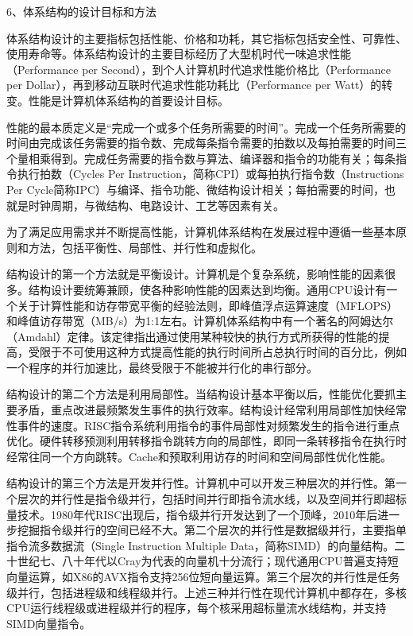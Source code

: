 \documentclass[]{ctexbook}
\begin{document}
6、体系结构的设计目标和方法

体系结构设计的主要指标包括性能、价格和功耗，其它指标包括安全性、可靠性、使用寿命等。体系结构设计的主要目标经历了大型机时代一味追求性能（Performance per Second），到个人计算机时代追求性能价格比（Performance per Dollar），再到移动互联时代追求性能功耗比（Performance per Watt）的转变。性能是计算机体系结构的首要设计目标。

性能的最本质定义是``完成一个或多个任务所需要的时间''。完成一个任务所需要的时间由完成该任务需要的指令数、完成每条指令需要的拍数以及每拍需要的时间三个量相乘得到。完成任务需要的指令数与算法、编译器和指令的功能有关；每条指令执行拍数（Cycles Per Instruction，简称CPI）或每拍执行指令数（Instructions Per Cycle简称IPC）与编译、指令功能、微结构设计相关；每拍需要的时间，也就是时钟周期，与微结构、电路设计、工艺等因素有关。

为了满足应用需求并不断提高性能，计算机体系结构在发展过程中遵循一些基本原则和方法，包括平衡性、局部性、并行性和虚拟化。

结构设计的第一个方法就是平衡设计。计算机是个复杂系统，影响性能的因素很多。结构设计要统筹兼顾，使各种影响性能的因素达到均衡。通用CPU设计有一个关于计算性能和访存带宽平衡的经验法则，即峰值浮点运算速度（MFLOPS）和峰值访存带宽（MB/s）为1:1左右。计算机体系结构中有一个著名的阿姆达尔（Amdahl）定律。该定律指出通过使用某种较快的执行方式所获得的性能的提高，受限于不可使用这种方式提高性能的执行时间所占总执行时间的百分比，例如一个程序的并行加速比，最终受限于不能被并行化的串行部分。

结构设计的第二个方法是利用局部性。当结构设计基本平衡以后，性能优化要抓主要矛盾，重点改进最频繁发生事件的执行效率。结构设计经常利用局部性加快经常性事件的速度。RISC指令系统利用指令的事件局部性对频繁发生的指令进行重点优化。硬件转移预测利用转移指令跳转方向的局部性，即同一条转移指令在执行时经常往同一个方向跳转。Cache和预取利用访存的时间和空间局部性优化性能。

结构设计的第三个方法是开发并行性。计算机中可以开发三种层次的并行性。第一个层次的并行性是指令级并行，包括时间并行即指令流水线，以及空间并行即超标量技术。1980年代RISC出现后，指令级并行开发达到了一个顶峰，2010年后进一步挖掘指令级并行的空间已经不大。第二个层次的并行性是数据级并行，主要指单指令流多数据流（Single Instruction Multiple Data，简称SIMD）的向量结构。二十世纪七、八十年代以Cray为代表的向量机十分流行；现代通用CPU普遍支持短向量运算，如X86的AVX指令支持256位短向量运算。第三个层次的并行性是任务级并行，包括进程级和线程级并行。上述三种并行性在现代计算机中都存在，多核CPU运行线程级或进程级并行的程序，每个核采用超标量流水线结构，并支持SIMD向量指令。
\end{document}
